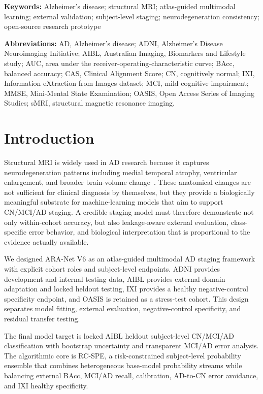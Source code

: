 \documentclass[12pt,a4paper]{article}
\begin{document}
\vspace{0.5em}
\noindent\textbf{Keywords:} Alzheimer's disease; structural MRI; atlas-guided multimodal learning; external validation; subject-level staging; neurodegeneration consistency; open-source research prototype

\vspace{0.5em}
\noindent\textbf{Abbreviations:} AD, Alzheimer's disease; ADNI, Alzheimer's Disease Neuroimaging Initiative; AIBL, Australian Imaging, Biomarkers and Lifestyle study; AUC, area under the receiver-operating-characteristic curve; BAcc, balanced accuracy; CAS, Clinical Alignment Score; CN, cognitively normal; IXI, Information eXtraction from Images dataset; MCI, mild cognitive impairment; MMSE, Mini-Mental State Examination; OASIS, Open Access Series of Imaging Studies; sMRI, structural magnetic resonance imaging.


\section{Introduction}
\label{sec:intro}

Structural MRI is widely used in AD research because it captures neurodegeneration patterns including medial temporal atrophy, ventricular enlargement, and broader brain-volume change~\citep{jack2018nia,frisoni2010neuroimaging}. These anatomical changes are not sufficient for clinical diagnosis by themselves, but they provide a biologically meaningful substrate for machine-learning models that aim to support CN/MCI/AD staging. A credible staging model must therefore demonstrate not only within-cohort accuracy, but also leakage-aware external evaluation, class-specific error behavior, and biological interpretation that is proportional to the evidence actually available.

We designed ARA-Net V6 as an atlas-guided multimodal AD staging framework with explicit cohort roles and subject-level endpoints. ADNI provides development and internal testing data, AIBL provides external-domain adaptation and locked heldout testing, IXI provides a healthy negative-control specificity endpoint, and OASIS is retained as a stress-test cohort. This design separates model fitting, external evaluation, negative-control specificity, and residual transfer testing.

The final model target is locked AIBL heldout subject-level CN/MCI/AD classification with bootstrap uncertainty and transparent MCI/AD error analysis. The algorithmic core is RC-SPE, a risk-constrained subject-level probability ensemble that combines heterogeneous base-model probability streams while balancing external BAcc, MCI/AD recall, calibration, AD-to-CN error avoidance, and IXI healthy specificity.
\end{document}
